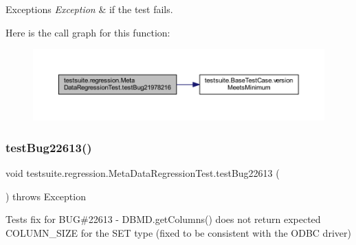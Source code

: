 \begin{DoxyExceptions}{Exceptions}
{\em Exception} & if the test fails. \\
\hline
\end{DoxyExceptions}
Here is the call graph for this function\+:
\nopagebreak
\begin{figure}[H]
\begin{center}
\leavevmode
\includegraphics[width=350pt]{classtestsuite_1_1regression_1_1_meta_data_regression_test_a375e1a8c67204d8fcbbca1bd9957881d_cgraph}
\end{center}
\end{figure}
\mbox{\label{classtestsuite_1_1regression_1_1_meta_data_regression_test_a5b7642788b0d18aad6874a2770cfdf5d}} 
\subsubsection{\texorpdfstring{test\+Bug22613()}{testBug22613()}}
{\footnotesize\ttfamily void testsuite.\+regression.\+Meta\+Data\+Regression\+Test.\+test\+Bug22613 (\begin{DoxyParamCaption}{ }\end{DoxyParamCaption}) throws Exception}

Tests fix for B\+UG\#22613 -\/ D\+B\+M\+D.\+get\+Columns() does not return expected C\+O\+L\+U\+M\+N\+\_\+\+S\+I\+ZE for the S\+ET type (fixed to be consistent with the O\+D\+BC driver)


